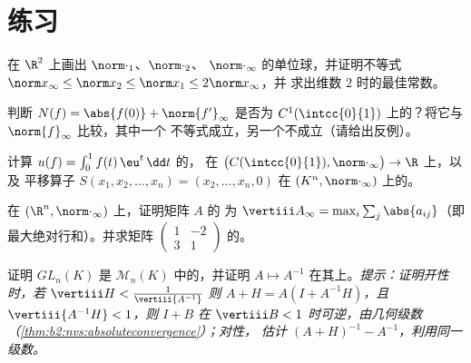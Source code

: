 \section{练习}

\begin{exercise}[$\star$]\label{exo:b2:nvs:1}
在 $\R^2$ 上画出 $\norm\cdot_1$、$\norm\cdot_2$、
$\norm\cdot_\infty$ 的单位球，并证明不等式 $\norm x_\infty
\leq \norm x_2 \leq \norm x_1 \leq 2\norm x_\infty$，并
求出维数 $2$ 时的最佳常数。
\end{exercise}

\begin{exercise}[$\star$]\label{exo:b2:nvs:2}
判断 $N(f) = \abs{f(0)} + \norm{f'}_\infty$ 是否为
$C^1(\intcc{0}{1})$ 上的？将它与 $\norm{f}_\infty$ 比较，其中一个
不等式成立，另一个不成立（请给出反例）。
\end{exercise}

\begin{exercise}[$\star$]\label{exo:b2:nvs:3}
计算 $u(f) = \int_0^1 f(t)\,\eu^t\,\dd t$ 的，
在 $\bigl(C(\intcc{0}{1}), \norm\cdot_\infty\bigr) \to \R$ 上，以及
平移算子 $S(x_1, x_2, \dots, x_n) = (x_2, \dots, x_n, 0)$ 在
$(K^n, \norm\cdot_\infty)$ 上的。
\end{exercise}

\begin{exercise}[$\star\star$]\label{exo:b2:nvs:4}
在 $(\R^n, \norm\cdot_\infty)$ 上，证明矩阵 $A$ 的
为 $\vertiii A_\infty = \max_i \sum_j \abs{a_{ij}}$（即
最大绝对行和）。并求矩阵 $\begin{pmatrix} 1 & -2\\
3 & 1\end{pmatrix}$ 的。
\end{exercise}

\begin{exercise}[$\star\star$]\label{exo:b2:nvs:5}
证明 $GL_n(K)$ 是 $\mathcal{M}_n(K)$ 中的，并证明 $A
\mapsto A^{-1}$ 在其上。\emph{提示：证明开性时，若
$\vertiii H < \frac{1}{\vertiii{A^{-1}}}$ 则 $A + H = A(I +
A^{-1}H)$，且 $\vertiii{A^{-1}H} < 1$，则 $I + B$ 在
$\vertiii B < 1$ 时可逆，由几何级数
（\cref{thm:b2:nvs:absoluteconvergence}）；对性，
估计 $(A+H)^{-1} - A^{-1}$，利用同一级数。}
\end{exercise}

